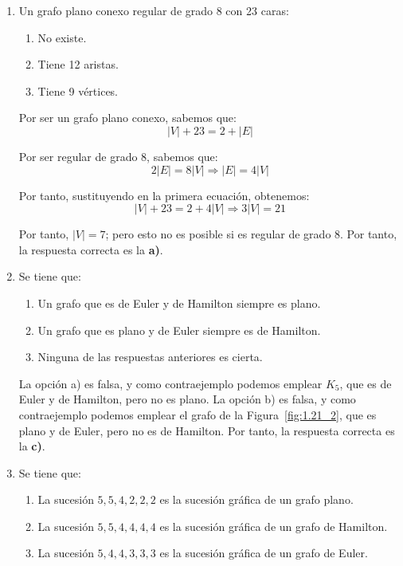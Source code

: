 \begin{ejercicio}
\begin{enumerate}
        \item Un grafo plano conexo regular de grado 8 con 23 caras:
        \begin{enumerate}
            \item No existe.
            \item Tiene 12 aristas.
            \item Tiene 9 vértices.
        \end{enumerate}

        Por ser un grafo plano conexo, sabemos que:
        \begin{equation*}
            |V|+23=2+|E|
        \end{equation*}

        Por ser regular de grado $8$, sabemos que:
        \begin{equation*}
            2|E|=8|V|\Longrightarrow |E|=4|V|
        \end{equation*}

        Por tanto, sustituyendo en la primera ecuación, obtenemos:
        \begin{equation*}
            |V|+23=2+4|V|\Longrightarrow 3|V|=21
        \end{equation*}


        Por tanto, $|V|=7$; pero esto no es posible si es regular de grado 8. Por tanto, la respuesta correcta es la \textbf{a)}.
        \item Se tiene que:
        \begin{enumerate}
            \item Un grafo que es de Euler y de Hamilton siempre es plano.
            \item Un grafo que es plano y de Euler siempre es de Hamilton.
            \item Ninguna de las respuestas anteriores es cierta.
        \end{enumerate}

        La opción a) es falsa, y como contraejemplo podemos emplear $K_5$, que es de Euler y de Hamilton, pero no es plano.
        La opción b) es falsa, y como contraejemplo podemos emplear el grafo de la Figura~\ref{fig:1.21_2}, que es plano y de Euler, pero no es de Hamilton.
        Por tanto, la respuesta correcta es la \textbf{c)}.
        \item \label{ej:1.36_4}
        Se tiene que:
        \begin{enumerate}
            \item La sucesión $5, 5, 4, 2, 2, 2$ es la sucesión gráfica de un grafo plano.
            \item La sucesión $5, 5, 4, 4, 4, 4$ es la sucesión gráfica de un grafo de Hamilton.
            \item La sucesión $5, 4, 4, 3, 3, 3$ es la sucesión gráfica de un grafo de Euler.
        \end{enumerate}


\end{enumerate}
\end{ejercicio}
